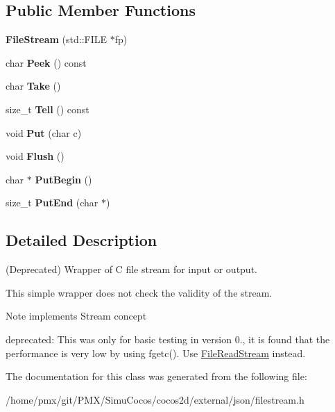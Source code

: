 \subsection*{Public Member Functions}
\begin{DoxyCompactItemize}
\item 
\mbox{\label{classFileStream_a6fde58817cd007440c8b9e68e5affb97}} 
{\bfseries File\+Stream} (std\+::\+F\+I\+LE $\ast$fp)
\item 
\mbox{\label{classFileStream_a4a1313420f8e2a70d64aea93f74fe6c7}} 
char {\bfseries Peek} () const
\item 
\mbox{\label{classFileStream_a73acfe1397558b60afcee732e63a9087}} 
char {\bfseries Take} ()
\item 
\mbox{\label{classFileStream_a5ce195d8a2bba3f3e3fcb8f14a66176c}} 
size\+\_\+t {\bfseries Tell} () const
\item 
\mbox{\label{classFileStream_ae8af9a5c2a5982c6dd19dde23a6d455e}} 
void {\bfseries Put} (char c)
\item 
\mbox{\label{classFileStream_aa1258c8c83aec85987ab5866f222bafd}} 
void {\bfseries Flush} ()
\item 
\mbox{\label{classFileStream_a0d8ed908ea40a634fb2f6b510d9d115e}} 
char $\ast$ {\bfseries Put\+Begin} ()
\item 
\mbox{\label{classFileStream_a627c5916b0b977069baf4f1e76f43e45}} 
size\+\_\+t {\bfseries Put\+End} (char $\ast$)
\end{DoxyCompactItemize}


\subsection{Detailed Description}
(Deprecated) Wrapper of C file stream for input or output. 

This simple wrapper does not check the validity of the stream. \begin{DoxyNote}{Note}
implements Stream concept 

deprecated\+: This was only for basic testing in version 0., it is found that the performance is very low by using fgetc(). Use \hyperlink{classFileReadStream}{File\+Read\+Stream} instead. 
\end{DoxyNote}


The documentation for this class was generated from the following file\+:\begin{DoxyCompactItemize}
\item 
/home/pmx/git/\+P\+M\+X/\+Simu\+Cocos/cocos2d/external/json/filestream.\+h\end{DoxyCompactItemize}

